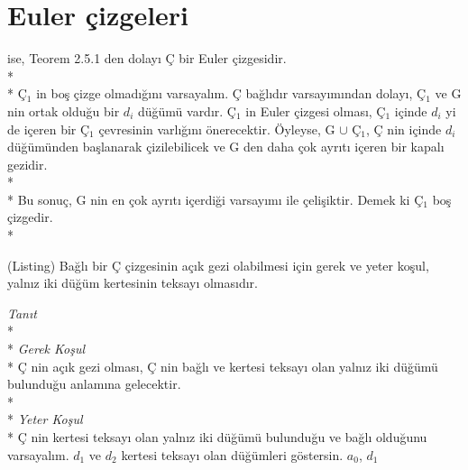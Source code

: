 \documentclass{amsbook}
\begin{document}
\section{Euler çizgeleri}
ise, Teorem 2.5.1 den dolayı Ç bir Euler çizgesidir.\\*\\*
Ç$_{1}$ in boş çizge olmadığını varsayalım. Ç bağlıdır varsayımından dolayı, Ç$_{1}$ ve G nin ortak olduğu bir $d_{i}$ düğümü vardır. Ç$_{1}$ in Euler çizgesi olması, Ç$_{1}$ içinde $d_{i}$ yi de içeren bir Ç$_{1}$ çevresinin varlığını önerecektir. Öyleyse, G $\cup$ Ç$_{1}$, Ç nin içinde $d_{i}$ düğümünden başlanarak çizilebilicek ve G den daha çok ayrıtı içeren bir kapalı gezidir.\\*\\*
Bu sonuç, G nin en çok ayrıtı içerdiği varsayımı ile çelişiktir. Demek ki Ç$_{1}$ boş çizgedir.\\*
\begin{theorem}(Listing) Bağlı bir Ç çizgesinin açık gezi olabilmesi için gerek ve yeter koşul, yalnız iki düğüm kertesinin teksayı olmasıdır.
\end{theorem}
\textit{Tanıt}\\*\\*
\textit{Gerek Koşul}\\*
Ç nin açık gezi olması, Ç nin bağlı ve kertesi teksayı olan yalnız iki düğümü bulunduğu anlamına gelecektir.\\*\\*
\textit{Yeter Koşul}\\*
Ç nin kertesi teksayı olan yalnız iki düğümü bulunduğu ve bağlı olduğunu varsayalım. $d_{1}$ ve $d_{2}$ kertesi teksayı olan düğümleri göstersin. $a_{0}$, $d_{1}$\\
\end{document}
